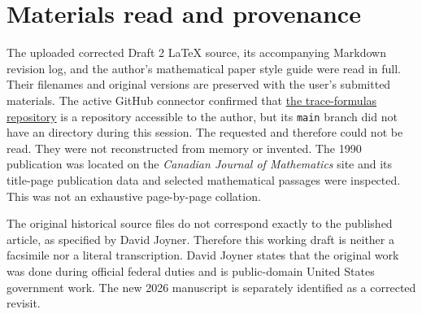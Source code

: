 \documentclass[12pt,letterpaper]{amsart}
\begin{document}
\section{Materials read and provenance}
The uploaded corrected Draft 2 LaTeX source, its accompanying Markdown
revision log, and the author's mathematical paper style guide were
read in full. Their filenames and original versions are preserved
with the user's submitted materials.
The active GitHub connector confirmed that
\href{https://github.com/wdjoyner/trace-formulas}{the trace-formulas repository} is a repository
accessible to the author, but its \texttt{main} branch did not have an
 directory during this session. The requested
 and
 therefore could not be
read. They were not reconstructed from memory or invented.
The 1990 publication was located on the \emph{Canadian Journal of
Mathematics} site and its title-page publication data and selected
mathematical passages were inspected. This was not an exhaustive
page-by-page collation.

The original historical source files do not correspond exactly to the
published article, as specified by David Joyner. Therefore this
working draft is neither a facsimile nor a literal transcription.
David Joyner states that the original work was done during official
federal duties and is public-domain United States government work.
The new 2026 manuscript is separately identified as a corrected revisit.
\end{document}
